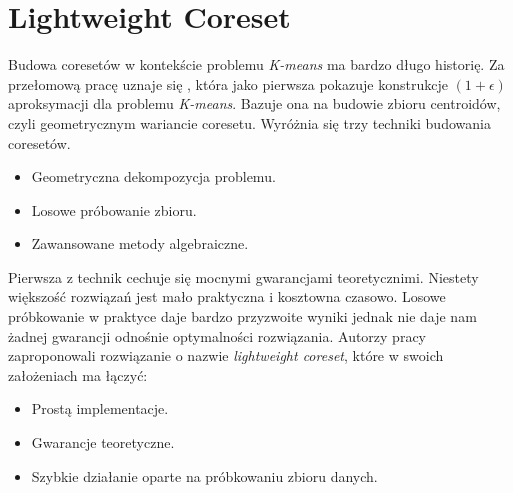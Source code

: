 \chapter{Lightweight Coreset}\label{lightweight}

Budowa coresetów w kontekście problemu \textit{K-means} ma bardzo długo historię.
Za przełomową pracę uznaje się \cite{Matousek99onapproximate}, która jako pierwsza pokazuje konstrukcje $(1+\epsilon)$ aproksymacji dla problemu \textit{K-means}.
Bazuje ona na budowie zbioru centroidów, czyli geometrycznym wariancie coresetu.
Wyróżnia się trzy techniki budowania coresetów.
\begin{itemize}
    \item Geometryczna dekompozycja problemu.
    \item Losowe próbowanie zbioru.
    \item Zawansowane metody algebraiczne.
\end{itemize}
Pierwsza z technik cechuje się mocnymi gwarancjami teoretycznimi.
Niestety większość rozwiązań jest mało praktyczna i kosztowna czasowo.
Losowe próbkowanie w praktyce daje bardzo przyzwoite wyniki jednak nie daje nam żadnej gwarancji odnośnie optymalności rozwiązania.
Autorzy pracy \cite{bachem2017scalable} zaproponowali rozwiązanie o nazwie \textit{lightweight coreset}, które w swoich założeniach ma łączyć:
\begin{itemize}
    \item Prostą implementacje.
    \item Gwarancje teoretyczne.
    \item Szybkie działanie oparte na próbkowaniu zbioru danych.
\end{itemize}


